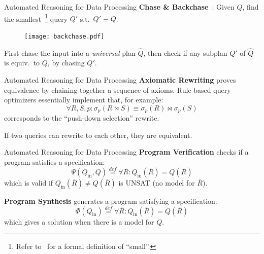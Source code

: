\documentclass{beamer}
\begin{document}
  \begin{frame}{Automated Reasoning for Data Processing}
    \textbf{Chase \& Backchase}~\cite{backchase}: Given $Q$, find the smallest~\footnote{
      Refer to~\cite{backchase} for a formal definition of ``small''.
    }
    query $Q'$ s.t.~$Q'\equiv Q$.
    \begin{figure}
      \texttt{[image: backchase.pdf]}
    \end{figure}
    First chase the input into a {\em universal} plan $\hat Q$, \pause 
    then check if any subplan $Q'$ of $\hat Q$ is equiv.~to $Q$,
    by chasing $Q'$.
  \end{frame}


  \begin{frame}{Automated Reasoning for Data Processing}
    \textbf{Axiomatic Rewriting} proves equivalence by chaining together 
    a sequence of axioms. \pause
    Rule-based query optimizers essentially implement that, for example:
    \[\forall R, S, p: \sigma_p (R\bowtie S) \equiv \sigma_p(R) \bowtie \sigma_p(S)\]
    corresponds to the ``push-down selection'' rewrite.\pause

    If two queries can rewrite to each other, they are equivalent.
  \end{frame}

  \begin{frame}{Automated Reasoning for Data Processing}
    \textbf{Program Verification} checks if a program satisfies a specification:
    \[\Psi(Q_{\text{in}}, Q) \stackrel{def}{=} \forall \bar R : Q_{\text{in}}(\bar R) = Q(\bar R)\]
    which is valid if $Q_{\text{in}}(\bar R) \neq Q(\bar R)$ is UNSAT (no model for $\bar R$). \pause

    \textbf{Program Synthesis} generates a program satisfying a specification:
    \[\Phi(Q_{\text{in}}) \stackrel{def}{=} \forall \bar R : Q_{\text{in}}(\bar R) = Q(\bar R)\]
    which gives a solution when there is a model for $Q$.
  \end{frame}
\end{document}
